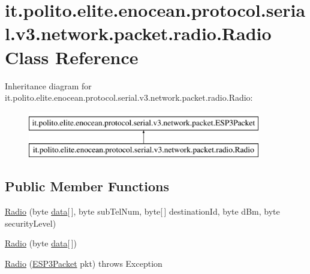 \hypertarget{classit_1_1polito_1_1elite_1_1enocean_1_1protocol_1_1serial_1_1v3_1_1network_1_1packet_1_1radio_1_1_radio}{}\section{it.\+polito.\+elite.\+enocean.\+protocol.\+serial.\+v3.\+network.\+packet.\+radio.\+Radio Class Reference}
\label{classit_1_1polito_1_1elite_1_1enocean_1_1protocol_1_1serial_1_1v3_1_1network_1_1packet_1_1radio_1_1_radio}
Inheritance diagram for it.\+polito.\+elite.\+enocean.\+protocol.\+serial.\+v3.\+network.\+packet.\+radio.\+Radio\+:\begin{figure}[H]
\begin{center}
\leavevmode
\includegraphics[height=2.000000cm]{classit_1_1polito_1_1elite_1_1enocean_1_1protocol_1_1serial_1_1v3_1_1network_1_1packet_1_1radio_1_1_radio}
\end{center}
\end{figure}
\subsection*{Public Member Functions}
\begin{DoxyCompactItemize}
\item 
\hyperlink{classit_1_1polito_1_1elite_1_1enocean_1_1protocol_1_1serial_1_1v3_1_1network_1_1packet_1_1radio_1_1_radio_aa4372049bcbfeafcfd42bb8273873ea1}{Radio} (byte \hyperlink{classit_1_1polito_1_1elite_1_1enocean_1_1protocol_1_1serial_1_1v3_1_1network_1_1packet_1_1_e_s_p3_packet_a3b52eafc90090190d976e3ddeae2b591}{data}\mbox{[}$\,$\mbox{]}, byte sub\+Tel\+Num, byte\mbox{[}$\,$\mbox{]} destination\+Id, byte d\+Bm, byte security\+Level)
\item 
\hyperlink{classit_1_1polito_1_1elite_1_1enocean_1_1protocol_1_1serial_1_1v3_1_1network_1_1packet_1_1radio_1_1_radio_a7e512b54e2eb8b9b89bfb56c1f4fe097}{Radio} (byte \hyperlink{classit_1_1polito_1_1elite_1_1enocean_1_1protocol_1_1serial_1_1v3_1_1network_1_1packet_1_1_e_s_p3_packet_a3b52eafc90090190d976e3ddeae2b591}{data}\mbox{[}$\,$\mbox{]})
\item 
\hyperlink{classit_1_1polito_1_1elite_1_1enocean_1_1protocol_1_1serial_1_1v3_1_1network_1_1packet_1_1radio_1_1_radio_a8ca4d9c8604d09785c2af56b133e5ee5}{Radio} (\hyperlink{classit_1_1polito_1_1elite_1_1enocean_1_1protocol_1_1serial_1_1v3_1_1network_1_1packet_1_1_e_s_p3_packet}{E\+S\+P3\+Packet} pkt)  throws Exception 	
\end{DoxyCompactItemize}
